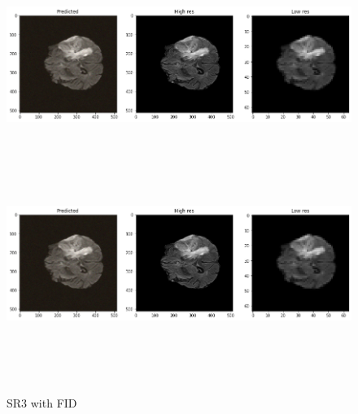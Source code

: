 \begin{figure}[!htbp]
  \begin{center}
    \leavevmode
    \ifpdf
      \includegraphics[height=2in]{Chapter4/images/spam3.png}
    \else
      \includegraphics[bb = 92 86 545 742, height=3in]{Chapter4/images/spam3.png}
    \fi
    \caption{SR3 with FID}
    \label{SR3 FID}
  \end{center}
\end{figure} 

